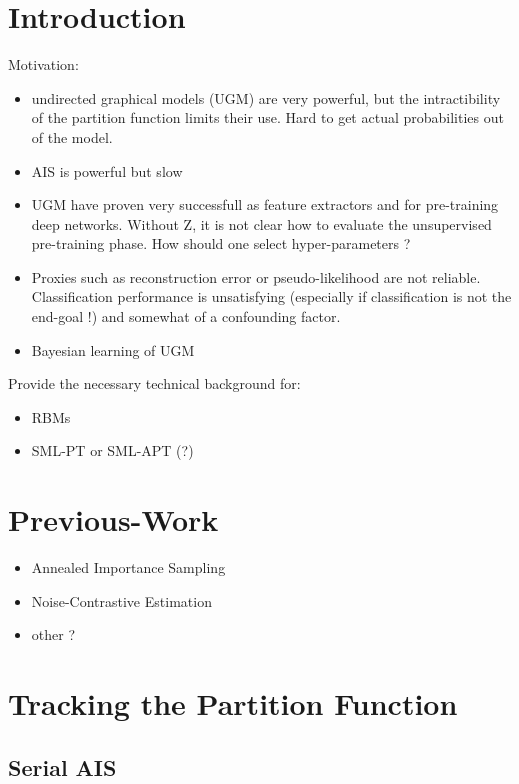 \documentclass[runningheads,a4paper]{llncs}
\begin{document}
\section{Introduction}

Motivation:
\begin{itemize}
    \item undirected graphical models (UGM) are very powerful, but the
        intractibility of the partition function limits their use. Hard to get
        actual probabilities out of the model.
    \item AIS is powerful but slow
    \item UGM have proven very successfull as feature extractors and for
        pre-training deep networks. Without Z, it is not clear how to evaluate
        the unsupervised pre-training phase. How should one select
        hyper-parameters ?
    \item Proxies such as reconstruction error or pseudo-likelihood are not
        reliable. Classification performance is unsatisfying (especially if
        classification is not the end-goal !) and somewhat of a confounding
        factor.
    \item Bayesian learning of UGM
\end{itemize}

\noindent Provide the necessary technical background for:
\begin{itemize}
    \item RBMs
    \item SML-PT or SML-APT (?)
\end{itemize}

\section{Previous-Work}

\begin{itemize}
    \item Annealed Importance Sampling
    \item Noise-Contrastive Estimation
    \item other ?
\end{itemize}

\section{Tracking the Partition Function}

\subsection{Serial AIS}
\end{document}
